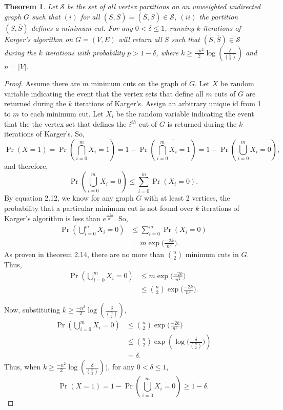 \documentclass[psamsfonts, 10pt]{amsart}
\newtheorem{thm}{Theorem}[section]
\theoremstyle{definition}
\theoremstyle{remark}
\numberwithin{equation}{section}
\begin{document}
\begin{thm}
Let $\mathscr{S}$ be the set of all vertex partitions on an unweighted undirected graph $G$ such that $(i)$ for all $(S, \overline{S}) = (\overline{S}, S) \in \mathscr{S}$, $(ii)$ the partition $(S, \overline{S})$ defines a minimum cut. For any $0 < \delta \leq 1$, running $k$ iterations of Karger's algorithm on $G = (V,E)$ will return all $S$ such that $(S, \overline{S}) \in \mathscr{S}$ during the $k$ iterations with probability $p > 1 - \delta$, where $k \geq \frac{-n^2}{2}\log\left(\frac{\delta}{\binom{n}{2}}\right)$ and $n = \lvert V \rvert$. 
\end{thm}
\begin{proof}
Assume there are $m$ minimum cuts on the graph of $G$. Let $X$ be random variable indicating the event that the vertex sets that define all $m$ cuts of $G$ are returned during the $k$ iterations of Karger's. Assign an arbitrary unique id from 1 to $m$ to each minimum cut. Let $X_i$ be the random variable indicating the event that the the vertex set that defines the $i^{th}$ cut of $G$ is returned during the $k$ iterations of Karger's. So,
\[
\Pr(X = 1) = \Pr\left(\bigcap_{i = 0}^m X_i = 1\right) = 1 - \Pr\left(\overline{\bigcap_{i = 0}^m X_i = 1}\right) = 1 - \Pr\left(\bigcup_{i = 0}^m X_i = 0 \right),
\]
and therefore,
\[
\Pr\left(\bigcup_{i = 0}^m X_i = 0 \right) \leq \sum_{i = 0}^m \Pr(X_i = 0).
\]
By equation 2.12, we know for any graph $G$ with at least 2 vertices, the probability that a particular minimum cut is not found over $k$ iterations of Karger's algorithm is less than $e^{\frac{-2k}{n^2}}$. So,
\[
\begin{aligned}
\Pr\left(\bigcup_{i = 0}^m X_i = 0 \right) &\leq \sum_{i = 0}^m \Pr(X_i = 0)\\
&= m\exp\Big(\frac{-2k}{n^2}\Big).
\end{aligned}
\]
As proven in theorem 2.14, there are no more than $\binom{n}{2}$ minimum cuts in $G$. Thus,
\begin{equation}
\begin{aligned}
\Pr\left(\bigcup_{i = 0}^m X_i = 0 \right) &\leq m\exp\Big(\frac{-2k}{n^2}\Big)\\
&\leq \binom{n}{2}\exp\Big(\frac{-2k}{n^2}\Big).
\end{aligned}
\end{equation}

Now, substituting $k \geq \frac{-n^2}{2}\log\left(\frac{\delta}{\binom{n}{2}}\right)$,
\begin{equation}
\begin{aligned}
\Pr\left(\bigcup_{i = 0}^m X_i = 0 \right) &\leq \binom{n}{2}\exp\Big(\frac{-2k}{n^2}\Big)\\
&\leq \binom{n}{2}\exp\left(\log\bigg(\frac{\delta}{\binom{n}{2}}\bigg)\right)\\
 &= \delta.
\end{aligned}
\end{equation}
Thus, when $k \geq \frac{-n^2}{2}\log\left(\frac{\delta}{\binom{n}{2}}\right))$, for any $0 < \delta \leq 1$,
\[
\Pr(X = 1)  =  1 - \Pr\left(\bigcup_{i = 0}^m X_i = 0 \right) \geq 1 - \delta.
\]
\end{proof}
\end{document}
